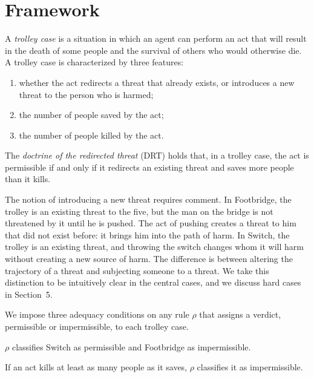 \documentclass{situationist-preprint}
\begin{document}
\section{Framework}

\begin{definition}\label{d:case}
A \emph{trolley case} is a situation in which an agent can perform an act that will result in the death of some people and the survival of others who would otherwise die. A trolley case is characterized by three features:
\begin{enumerate}[label=(\alph*)]
\item whether the act redirects a threat that already exists, or introduces a new threat to the person who is harmed;
\item the number of people saved by the act;
\item the number of people killed by the act.
\end{enumerate}
\end{definition}

\begin{definition}\label{d:redirected}
The \emph{doctrine of the redirected threat} (DRT) holds that, in a trolley case, the act is permissible if and only if it redirects an existing threat and saves more people than it kills.
\end{definition}

The notion of introducing a new threat requires comment. In Footbridge, the trolley is an existing threat to the five, but the man on the bridge is not threatened by it until he is pushed. The act of pushing creates a threat to him that did not exist before: it brings him into the path of harm. In Switch, the trolley is an existing threat, and throwing the switch changes whom it will harm without creating a new source of harm. The difference is between altering the trajectory of a threat and subjecting someone to a threat. We take this distinction to be intuitively clear in the central cases, and we discuss hard cases in Section~5.

We impose three adequacy conditions on any rule $\rho$ that assigns a verdict, permissible or impermissible, to each trolley case.

\begin{principle}[Verdicts]\label{p:verdicts}
$\rho$ classifies Switch as permissible and Footbridge as impermissible.
\end{principle}

\begin{principle}[Numbers]\label{p:numbers}
If an act kills at least as many people as it saves, $\rho$ classifies it as impermissible.
\end{principle}
\end{document}
